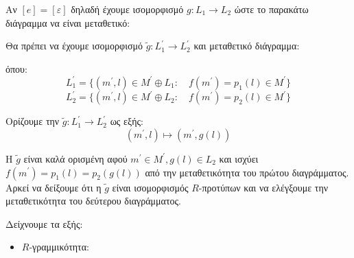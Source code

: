 \documentclass{article}
\begin{document}
\begin{enumerate}
	Αν $[e] = [\varepsilon]$ δηλαδή έχουμε ισομορφισμό $g: L_1 \rightarrow L_2$ ώστε το παρακάτω διάγραμμα να είναι μεταθετικό:

	\begin{center}
	\end{center}

	Θα πρέπει να έχουμε ισομορφισμό $\widetilde{g} : L^{\prime}_1 \rightarrow L^{\prime}_2$ και μεταθετικό διάγραμμα:

	\begin{center}
	\end{center}

	όπου:
	$$L^{\prime}_1 = \{ (m^{\prime}, l) \in M^{\prime} \oplus L_1 : \quad f(m^{\prime}) = p_1 (l) \in M^{\prime} \}$$
	$$L^{\prime}_2 = \{ (m^{\prime}, l) \in M^{\prime} \oplus L_2 : \quad f(m^{\prime}) = p_2 (l) \in M^{\prime} \} $$


	Ορίζουμε την $\widetilde{g} : L^{\prime}_1 \rightarrow L^{\prime}_2 $ ως εξής:
	$$(m^{\prime}, l) \longmapsto (m^{\prime}, g(l))$$

	H $\widetilde{g}$ είναι καλά ορισμένη αφού $m^{\prime} \in M^{\prime}, g(l) \in L_2$ και ισχύει $f(m^{\prime} ) = p_1 (l) = p_2 (g(l))$ από την μεταθετικότητα του πρώτου διαγράμματος. Αρκεί να δείξουμε ότι η $\widetilde{g}$ είναι ισομορφισμός $R$-προτύπων και να ελέγξουμε την μεταθετικότητα του δεύτερου διαγράμματος.

	Δείχνουμε τα εξής:

	\begin{itemize}
		\item $R$-γραμμικότητα:


\end{itemize}
\end{enumerate}
\end{document}
